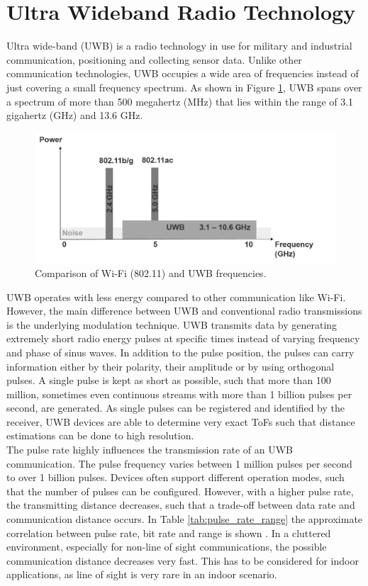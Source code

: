 \section{Ultra Wideband Radio Technology}
Ultra wide-band (UWB) is a radio technology in use for military and industrial communication, positioning and collecting sensor data. Unlike other communication technologies, UWB occupies a wide area of frequencies instead of just covering a small frequency spectrum. As shown in Figure \ref{fig:frequency_spectrum}, UWB spans over a spectrum of more than 500 megahertz (MHz) that lies within the range of 3.1 gigahertz (GHz) and 13.6 GHz.
\begin{figure}[th]
\centering
\includegraphics[width=1.0\textwidth]{Figures/frequency_spectrum}
\decoRule
\caption[UWB Frequency Spectrum]{Comparison of Wi-Fi (802.11) and UWB frequencies.}
\label{fig:frequency_spectrum}
\end{figure}
UWB operates with less energy compared to other communication like Wi-Fi. However, the main difference between UWB and conventional radio transmissions is the underlying modulation technique. UWB transmits data by generating extremely short radio energy pulses at specific times instead of varying frequency and phase of sinus waves. In addition to the pulse position, the pulses can carry information either by their polarity, their amplitude or by using orthogonal pulses.
A single pulse is kept as short as possible, such that more than 100 million, sometimes even continuous streams with more than 1 billion pulses per second, are generated. As single pulses can be registered and identified by the receiver, UWB devices are able to determine very exact ToFs such that distance estimations can be done to high resolution.\\
\noindent\hspace*{5mm}%
The pulse rate highly influences the transmission rate of an UWB communication. The pulse frequency varies between 1 million pulses per second to over 1 billion pulses. Devices often support different operation modes, such that the number of pulses can be configured. However, with a higher pulse rate, the transmitting distance decreases, such that a trade-off between data rate and communication distance occurs. In Table \ref{tab:pulse_rate_range} the approximate correlation between pulse rate, bit rate and range is shown \cite{ITU}. In a cluttered environment, especially for non-line of sight communications, the possible communication distance decreases very fast. This has to be considered for indoor applications, as line of sight is very rare in an indoor scenario.

